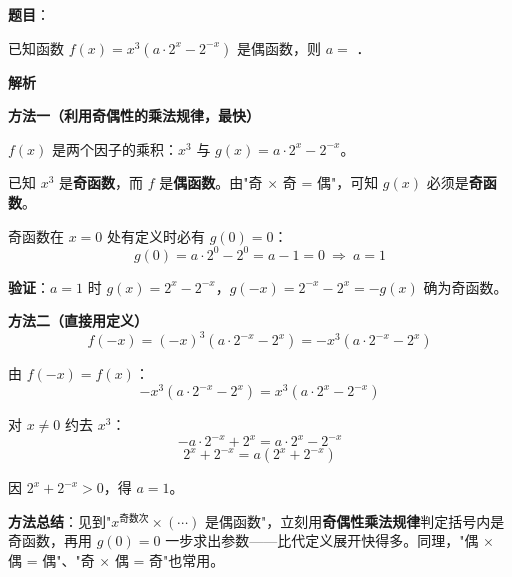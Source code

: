 \begin{answer}

\textbf{题目}：

已知函数 $f(x)=x^{3}\left(a\cdot2^{x}-2^{-x}\right)$ 是偶函数，则 $a=$ \gkblank{}．

\textbf{解析}

\textbf{方法一（利用奇偶性的乘法规律，最快）}

$f(x)$ 是两个因子的乘积：$x^{3}$ 与 $g(x)=a\cdot2^{x}-2^{-x}$。

已知 $x^{3}$ 是\textbf{奇函数}，而 $f$ 是\textbf{偶函数}。由"奇 × 奇 = 偶"，可知 $g(x)$ 必须是\textbf{奇函数}。

奇函数在 $x=0$ 处有定义时必有 $g(0)=0$：
\nopagebreak[4]
\[g(0)=a\cdot2^{0}-2^{0}=a-1=0\ \Longrightarrow\ a=1\]

\textbf{验证}：$a=1$ 时 $g(x)=2^{x}-2^{-x}$，$g(-x)=2^{-x}-2^{x}=-g(x)$  确为奇函数。

\textbf{方法二（直接用定义）}
\nopagebreak[4]
\[f(-x)=(-x)^{3}\left(a\cdot2^{-x}-2^{x}\right)=-x^{3}\left(a\cdot2^{-x}-2^{x}\right)\]

由 $f(-x)=f(x)$：
\nopagebreak[4]
\[-x^{3}\left(a\cdot2^{-x}-2^{x}\right)=x^{3}\left(a\cdot2^{x}-2^{-x}\right)\]

对 $x\ne0$ 约去 $x^{3}$：
\nopagebreak[4]
\[-a\cdot2^{-x}+2^{x}=a\cdot2^{x}-2^{-x}\]
\nopagebreak[4]
\[2^{x}+2^{-x}=a\left(2^{x}+2^{-x}\right)\]

因 $2^{x}+2^{-x}>0$，得 $a=1$。

\begin{gktip}
\textbf{方法总结}：见到"$x^{\text{奇数次}}\times(\cdots)$ 是偶函数"，立刻用\textbf{奇偶性乘法规律}判定括号内是奇函数，再用 $g(0)=0$ 一步求出参数——比代定义展开快得多。同理，"偶 × 偶 = 偶"、"奇 × 偶 = 奇"也常用。
\end{gktip}


\par\medskip

\end{answer}
